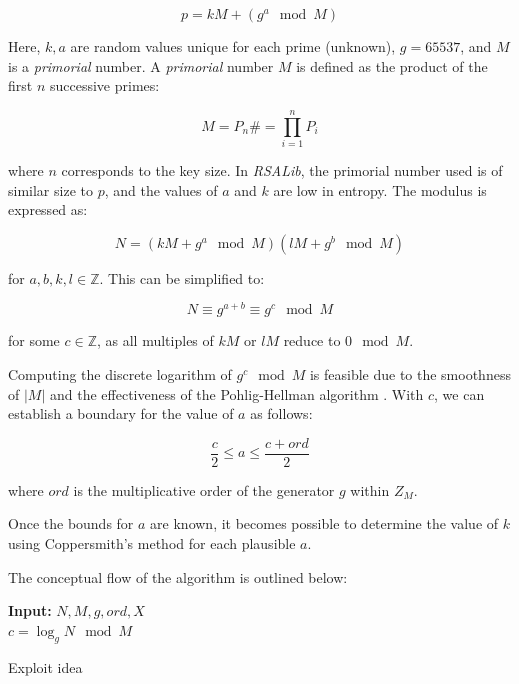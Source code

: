 \documentclass[a4paper,12pt]{report}
\newcommand{\Z}{\mathbb{Z}}
\begin{document}
\[
    p = kM + (g^a \mod M)
    \label{eq:roca}
\]

Here, $k, a$ are random values unique for each prime (unknown), $g = 65537$, and $M$ is a \textit{primorial} number. A \textit{primorial} number $M$ is defined as the product of the first $n$ successive primes:

\[
    M = P_n\# = \prod_{i=1}^{n} P_i
\]

where $n$ corresponds to the key size. In \textit{RSALib}, the primorial number used is of similar size to $p$, and the values of $a$ and $k$ are low in entropy. The modulus is expressed as:

\[
    N = (kM + g^{a}\mod M)(lM + g^{b}\mod M)
\]

for $a, b, k, l \in \Z$. This can be simplified to:

\[
    N \equiv g^{a + b} \equiv g^{c} \mod M
\]

for some $c \in \Z$, as all multiples of $kM$ or $lM$ reduce to $0 \mod M$.

Computing the discrete logarithm of $g^c \mod M$ is feasible due to the smoothness of $|M|$ and the effectiveness of the Pohlig-Hellman algorithm \cite{pohlig}. With $c$, we can establish a boundary for the value of $a$ as follows:

\[
    \frac{c}{2} \le a \le \frac{c + ord}{2}
\]

where $ord$ is the multiplicative order of the generator $g$ within $Z_M$.

Once the bounds for $a$ are known, it becomes possible to determine the value of $k$ using Coppersmith's method \cite{coppersmith96} for each plausible $a$.

The conceptual flow of the algorithm is outlined below:

\begin{algorithm}[H]
    \vspace*{5px}
    \textbf{Input: } $N, M, g, ord, X$ \; \\
    $c = \log_{g}N \mod M$ \;\\
    \caption{Exploit idea}
\end{algorithm}
\end{document}

